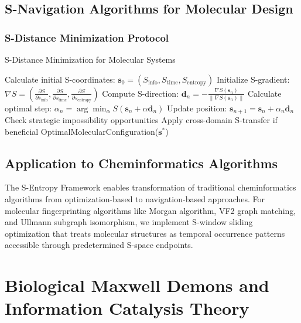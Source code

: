 \documentclass[11pt,a4paper]{article}
\begin{document}
\subsection{S-Navigation Algorithms for Molecular Design}

\subsubsection{S-Distance Minimization Protocol}

\begin{algorithm}
\caption{S-Distance Minimization for Molecular Systems}
\begin{algorithmic}
    \State Calculate initial S-coordinates: $\mathbf{s}_0 = (S_{\text{info}}, S_{\text{time}}, S_{\text{entropy}})$
    \State Initialize S-gradient: $\nabla S = \left(\frac{\partial S}{\partial s_{\text{info}}}, \frac{\partial S}{\partial s_{\text{time}}}, \frac{\partial S}{\partial s_{\text{entropy}}}\right)$
        \State Compute S-direction: $\mathbf{d}_n = -\frac{\nabla S(\mathbf{s}_n)}{\|\nabla S(\mathbf{s}_n)\|}$
        \State Calculate optimal step: $\alpha_n = \arg\min_{\alpha} S(\mathbf{s}_n + \alpha \mathbf{d}_n)$
        \State Update position: $\mathbf{s}_{n+1} = \mathbf{s}_n + \alpha_n \mathbf{d}_n$
        \State Check strategic impossibility opportunities
        \State Apply cross-domain S-transfer if beneficial
    \EndWhile
    \State \Return OptimalMolecularConfiguration($\mathbf{s}^*$)
\EndProcedure
\end{algorithmic}
\end{algorithm}

\subsection{Application to Cheminformatics Algorithms}

The S-Entropy Framework enables transformation of traditional cheminformatics algorithms from optimization-based to navigation-based approaches. For molecular fingerprinting algorithms like Morgan algorithm, VF2 graph matching, and Ullmann subgraph isomorphism, we implement S-window sliding optimization that treats molecular structures as temporal occurrence patterns accessible through predetermined S-space endpoints.

\section{Biological Maxwell Demons and Information Catalysis Theory}
\end{document}
